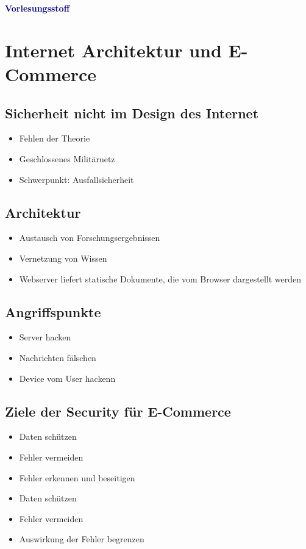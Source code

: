 \textbf{\textcolor{darkblue}{ Vorlesungsstoff}}~

	\section*{Internet Architektur und E-Commerce}
	
	\subsection*{Sicherheit nicht im Design des Internet}
		\begin{itemize}
		\item 	Fehlen der Theorie
		\item  Geschlossenes Militärnetz
		\item Schwerpunkt: Ausfallsicherheit
		\end{itemize}
	
	\subsection*{Architektur}
	\begin{itemize}
		\item 	Austausch von Forschungsergebnissen
		\item  Vernetzung von Wissen
		\item Webserver liefert statische Dokumente, die vom Browser dargestellt werden
	\end{itemize}

\subsection*{Angriffspunkte}
\begin{itemize}
	\item 	Server hacken
	\item  Nachrichten fälschen
	\item Device vom User hackenn
\end{itemize}

\subsection*{Ziele der Security für E-Commerce}
\begin{itemize}
	\item 	Daten schützen
	\item  Fehler vermeiden
	\item Fehler erkennen und beseitigen
	\item 	Daten schützen
	\item  Fehler vermeiden
	\item Auswirkung der Fehler begrenzen
\end{itemize}

